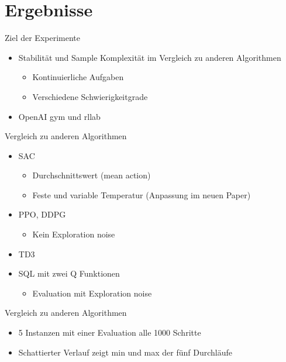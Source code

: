 \section{Ergebnisse}

\begin{frame}{Ziel der Experimente}
        \begin{itemize}
            \item Stabilität und Sample Komplexität im Vergleich zu anderen Algorithmen
            \begin{itemize}
                \item Kontinuierliche Aufgaben
                \item Verschiedene Schwierigkeitgrade
            \end{itemize}  
            \item OpenAI gym und rllab
        \end{itemize}
\end{frame}

\begin{frame}{Vergleich zu anderen Algorithmen}
    \begin{itemize}
        \item SAC
        \begin{itemize}
            \item Durchschnittswert (mean action)
            \item Feste und variable Temperatur (Anpassung im neuen Paper)
        \end{itemize} 
        \item PPO, DDPG
        \begin{itemize}
            \item Kein Exploration noise
        \end{itemize}
        \item TD3
        \item SQL mit zwei Q Funktionen
        \begin{itemize}
            \item Evaluation mit Exploration noise        
        \end{itemize}
    \end{itemize}
\end{frame}

\begin{frame}{Vergleich zu anderen Algorithmen}
    \begin{itemize}     
        \item 5 Instanzen mit einer Evaluation alle 1000 Schritte
        \item Schattierter Verlauf zeigt min und max der fünf Durchläufe
    \end{itemize}
    
\end{frame}


